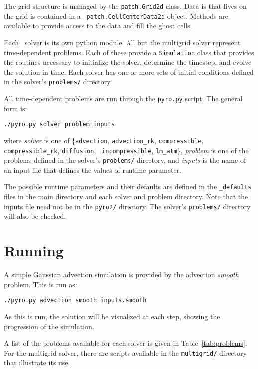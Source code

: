 The grid structure is managed by the {\tt patch.Grid2d} class.  Data
is that lives on the grid is contained in a {\tt
  patch.CellCenterData2d} object.  Methods are available to provide
access to the data and fill the ghost cells.

Each \pyro\ solver is its own python module.  All but the multigrid
solver represent time-dependent problems.  Each of these provide a
{\tt Simulation} class that provides the routines necessary to
initialize the solver, determine the timestep, and evolve the solution
in time.  Each solver has one or more sets of initial conditions
defined in the solver's {\tt problems/} directory.

All time-dependent problems are run through the {\tt pyro.py} script.
The general form is:
\begin{verbatim}
./pyro.py solver problem inputs
\end{verbatim}
 where {\em solver} is one of \{{\tt advection}, {\tt advection\_rk},
 {\tt compressible}, {\tt compressible\_rk}, {\tt diffusion}, {\tt
   incompressible}, {\tt lm\_atm}\}, {\em problem} is one of the
 problems defined in the solver's {\tt problems/} directory, and {\em
   inputs} is the name of an input file that defines the values of
 runtime parameter.

The possible runtime parameters and their defaults are defined in the
{\tt \_defaults} files in the main directory and each solver and
problem directory.  Note that the inputs file need not be in the 
{\tt pyro2/} directory.  The solver's {\tt problems/} directory
will also be checked.

\section{Running \pyro}

A simple Gaussian advection simulation is provided by the advection
{\em smooth} problem.  This is run as:
\begin{verbatim}
./pyro.py advection smooth inputs.smooth
\end{verbatim}
As this is run, the solution will be visualized at each step,
showing the progression of the simulation.  


A list of the problems available for each solver is given in
Table~\ref{tab:problems}.  For the multigrid solver, there are scripts
available in the {\tt multigrid/} directory that illustrate its use.



